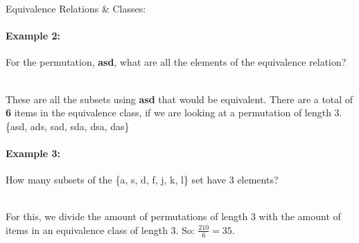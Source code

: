 \documentclass[a4paper,12pt]{book}
\begin{document}
\begin{intro}{Equivalence Relations \& Classes:}
                \paragraph{Example 2:} For the permutation, \textbf{asd},
                    what are all the elements of the equivalence relation?
                    ~\\~\\
                    \begin{answer}
                        These are all the subsets using \textbf{asd} that would be equivalent.
                        There are a total of \textbf{6} items in the equivalence class, if we
                        are looking at a permutation of length 3.
                        ~\\
                        \{asd, ads, sad, sda, dsa, das\}
                    \end{answer}

                \paragraph{Example 3:} How many subsets of the \{a, s, d, f, j, k, l\}
                    set have 3 elements?
                    ~\\~\\
                    \begin{answer}
                        For this, we divide the amount of permutations of length 3
                        with the amount of items in an equivalence class of length 3. So:
                        $\frac{210}{6} = 35$.
                    \end{answer}
        \end{intro}
\end{document}
